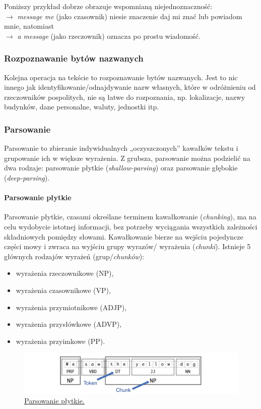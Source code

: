 \noindent Poniższy przykład dobrze obrazuje wspomnianą niejednoznaczność: \\
$\rightarrow$ \textit{message me} (jako czasownik)
niesie znaczenie daj mi znać lub powiadom mnie, natomiast \\
$\rightarrow$ \textit{a message}  (jako rzeczownik) oznacza po prostu wiadomość.


\subsubsection{Rozpoznawanie bytów nazwanych}
Kolejna operacja na tekście to rozpoznawanie bytów nazwanych. Jest to nic innego jak identyfikowanie/odnajdywanie nazw własnych, które w odróżnieniu od rzeczowników pospolitych, nie są łatwe do rozpoznania, np. lokalizacje, nazwy budynków, dane personalne, waluty, jednostki itp.


\subsubsection{Parsowanie}
Parsowanie to zbieranie indywidualnych „oczyszczonych” kawałków tekstu i grupowanie ich w większe wyrażenia.
Z grubsza, parsowanie można podzielić na dwa rodzaje: parsowanie płytkie (\textit{shallow-parsing}) oraz parsowanie głębokie (\textit{deep-parsing}).

\paragraph{Parsowanie płytkie}
Parsowanie płytkie, czasami określane terminem kawałkowanie (\textit{chunking}), ma na celu wydobycie istotnej informacji, bez potrzeby wyciągania wszystkich zależności składniowych pomiędzy słowami.
Kawałkowanie bierze na wejściu pojedyncze części mowy i zwraca na wyjściu grupy wyrazów/ wyrażenia (\textit{chunki}).
Istnieje 5 głównych rodzajów wyrażeń (grup/\textit{chunków}):
\begin{itemize}
	\item wyrażenia rzeczownikowe (NP),
	\item wyrażenia czasownikowe (VP),
	\item wyrażenia przymiotnikowe (ADJP),
	\item wyrażenia przysłówkowe (ADVP),
	\item wyrażenia przyimkowe (PP).
\end{itemize}

\begin{figure}[H]
	\centering
	\includegraphics[width=0.95\linewidth]{images/chapter1/shallowParsing.pdf}
	\caption{\href{http://www.nltk.org/book/ch07.html}{Parsowanie płytkie.}}
	\label{fig:shallowParsing}
\end{figure}



